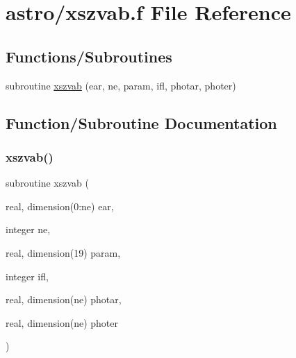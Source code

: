 \hypertarget{xszvab_8f}{}\section{astro/xszvab.f File Reference}
\label{xszvab_8f}
\subsection*{Functions/\+Subroutines}
\begin{DoxyCompactItemize}
\item 
subroutine \hyperlink{xszvab_8f_a578c3ea70e7e77d5ce73bb239c785dfe}{xszvab} (ear, ne, param, ifl, photar, photer)
\end{DoxyCompactItemize}


\subsection{Function/\+Subroutine Documentation}
\mbox{\label{xszvab_8f_a578c3ea70e7e77d5ce73bb239c785dfe}} 
\subsubsection{\texorpdfstring{xszvab()}{xszvab()}}
{\footnotesize\ttfamily subroutine xszvab (\begin{DoxyParamCaption}\item[{real, dimension(0\+:ne)}]{ear,  }\item[{integer}]{ne,  }\item[{real, dimension(19)}]{param,  }\item[{integer}]{ifl,  }\item[{real, dimension(ne)}]{photar,  }\item[{real, dimension(ne)}]{photer }\end{DoxyParamCaption})}

